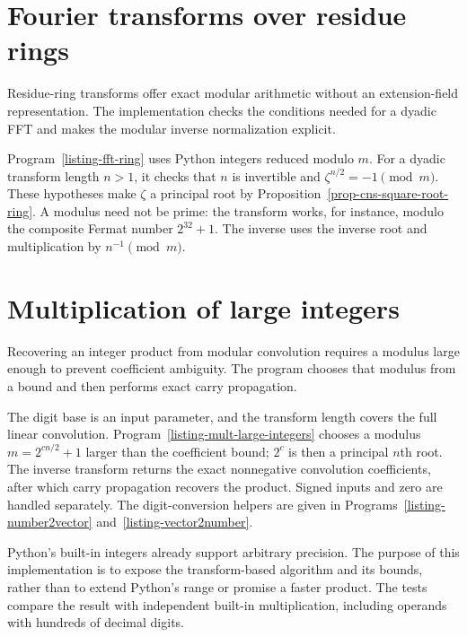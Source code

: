 \section{Fourier transforms over residue rings}
\label{sect1-listing-transform-ring}

Residue-ring transforms offer exact modular arithmetic without an
extension-field representation. The implementation checks the conditions
needed for a dyadic FFT and makes the modular inverse normalization
explicit.

Program~\ref{listing-fft-ring} uses Python integers reduced modulo $m$.
For a dyadic transform length $n>1$, it checks that $n$ is invertible and
$\zeta^{n/2}=-1\pmod m$. These hypotheses make $\zeta$ a principal root
by Proposition~\ref{prop-cns-square-root-ring}. A modulus need not be prime:
the transform works, for instance, modulo the composite Fermat number
$2^{32}+1$. The inverse uses the inverse root and multiplication by
$n^{-1}\pmod m$.
\begin{listing}[H]
\caption{A radix-two Fourier transform with modular integer arithmetic.}
\label{listing-fft-ring}
\end{listing}

\section{Multiplication of large integers}
\label{sect1-listing-mult-large-integers-ring}

Recovering an integer product from modular convolution requires a modulus
large enough to prevent coefficient ambiguity. The program chooses that
modulus from a bound and then performs exact carry propagation.

The digit base is an input parameter, and the transform length covers the
full linear convolution. Program~\ref{listing-mult-large-integers} chooses
a modulus $m=2^{cn/2}+1$ larger than the coefficient bound; $2^c$ is then
a principal $n$th root. The inverse transform returns the exact nonnegative
convolution coefficients, after which carry propagation recovers the product.
Signed inputs and zero are handled separately. The digit-conversion helpers
are given in Programs~\ref{listing-number2vector} and~\ref{listing-vector2number}.

Python's built-in integers already support arbitrary precision. The purpose
of this implementation is to expose the transform-based algorithm and its
bounds, rather than to extend Python's range or promise a faster product.
The tests compare the result with independent built-in multiplication,
including operands with hundreds of decimal digits.
\begin{listing}[H]
\caption{Exact integer multiplication with a sufficiently large modular transform.}
\label{listing-mult-large-integers}
\end{listing}

